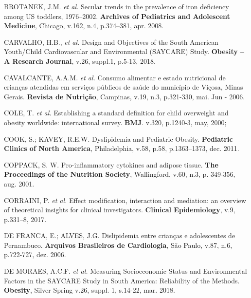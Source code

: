 \noindent BROTANEK, J.M. \textit{et al.} Secular trends in the prevalence of iron deficiency among US toddlers, 1976–2002. \textbf{Archives of Pediatrics and Adolescent Medicine}, Chicago, v.162, n.4, p.374–381, apr. 2008.


\bigbreak

\noindent CARVALHO, H.B., \textit{et al.} Design and Objectives of the South American Youth/Child Cardiovascular and Environmental (SAYCARE) Study. \textbf{Obesity – A Research Journal}, v.26, suppl.1, p.5-13, 2018.

\bigbreak

\noindent CAVALCANTE, A.A.M. \textit{et al.} Consumo alimentar e estado nutricional de crianças atendidas em serviços públicos de saúde do município de Viçosa, Minas Gerais. \textbf{Revista de Nutrição}, Campinas, v.19, n.3, p.321-330, mai. Jun - 2006.

\bigbreak

\noindent COLE, T. \textit{et al.} Establishing a standard definition for child overweight and obesity worldwide: international survey. \textbf{BMJ}. v.320, p.1240-3, may, 2000; 

\bigbreak

\noindent COOK, S.; KAVEY, R.E.W. Dyslipidemia and Pediatric Obesity. \textbf{Pediatric Clinics of North America}, Philadelphia, v.58, p.58, p.1363–1373, dec. 2011.


\bigbreak

\noindent COPPACK, S. W. Pro-inflammatory cytokines and adipose tissue. \textbf{The Proceedings of the Nutrition Society}, Wallingford, v.60, n.3, p. 349-356, aug. 2001.

\bigbreak

\noindent CORRAINI, P. \textit{et al.} Effect modification, interaction and mediation: an overview of theoretical insights for clinical investigators. \textbf{Clinical Epidemiology}, v.9, p.331–8, 2017.

\bigbreak

\noindent DE FRANCA, E.; ALVES, J.G. Dislipidemia entre crianças e adolescentes de Pernambuco. \textbf{Arquivos Brasileiros de Cardiologia}, São Paulo, v.87, n.6, p.722-727, dez. 2006.

\bigbreak

\noindent DE MORAES, A.C.F. \textit{et al.} Measuring Socioeconomic Status and Environmental Factors in the SAYCARE Study in South America: Reliability of the Methods. \textbf{Obesity}, Silver Spring v.26, suppl. 1, s.14-22, mar. 2018.
\bigbreak

